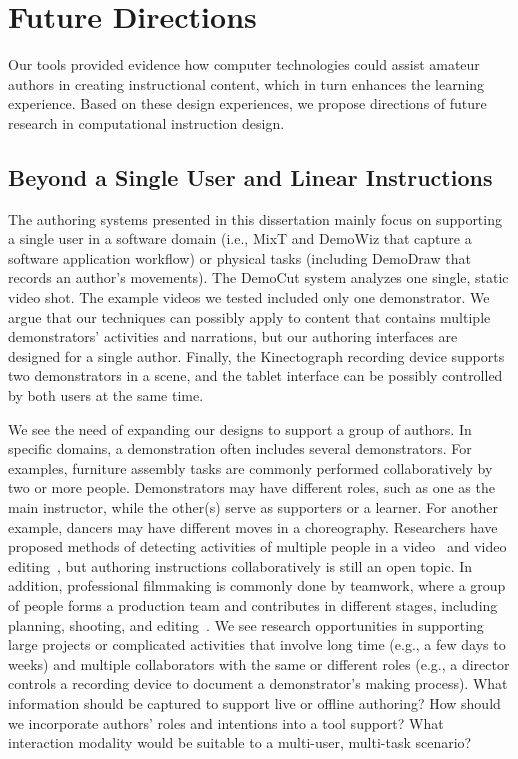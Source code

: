 \section{Future Directions} %

Our tools provided evidence how computer technologies could assist amateur authors in creating instructional content, which in turn enhances the learning experience. Based on these design experiences, we propose directions of future research in computational instruction design.

\subsection{Beyond a Single User and Linear Instructions}
The authoring systems presented in this dissertation mainly focus on supporting a single user in a software domain (i.e., MixT and DemoWiz that capture a software application workflow) or physical tasks (including DemoDraw that records an author's movements).
%
The DemoCut system analyzes one single, static video shot. The example videos we tested included only one demonstrator. We argue that our techniques can possibly apply to content that contains multiple demonstrators' activities and narrations, but our authoring interfaces are designed for a single author.
%
Finally, the Kinectograph recording device supports two demonstrators in a scene, and the tablet interface can be possibly controlled by both users at the same time.

We see the need of expanding our designs to support a group of authors. In specific domains, a demonstration often includes several demonstrators. For examples, furniture assembly tasks are commonly performed collaboratively by two or more people. Demonstrators may have different roles, such as one as the main instructor, while the other(s) serve as supporters or a learner. For another example, dancers may have different moves in a choreography.
%
Researchers have proposed methods of detecting activities of multiple people in a video~\cite{dou-siggraph2016} and video editing~\cite{PatelUIST16}, but authoring instructions collaboratively is still an open topic.
%
In addition, professional filmmaking is commonly done by teamwork, where a group of people forms a production team and contributes in different stages, including planning, shooting, and editing~\cite{pincus2012the}. We see research opportunities in supporting large projects or complicated activities that involve long time (e.g., a few days to weeks) and multiple collaborators with the same or different roles (e.g., a director controls a recording device to document a demonstrator's making process).
What information should be captured to support live or offline authoring? How should we incorporate authors' roles and intentions into a tool support? What interaction modality would be suitable to a multi-user, multi-task scenario?

